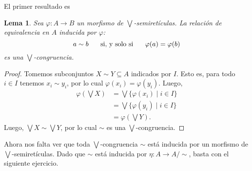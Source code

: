 \documentclass[12pt,letterpaper,titlepage]{article}
\newtheorem{lemma}{Lema}
\theoremstyle{definition}
\newcommand\Sup{\bigvee}
\renewcommand\phi{\varphi}
\newcommand\simr{{\sim}}
\newcommand\ssi{\hspace{5mm}\text{ si, y solo si }\hspace{5mm}}
\newcommand\<{\langle}
\renewcommand\>{\rangle}
\begin{document}
El primer resultado es
\begin{lemma}
    Sea $\phi:A\to B$ un morfismo de $\Sup$-semiretículas.
    La relación de equivalencia en $A$ inducida por $\phi$:
    \[
        a\sim b \ssi \phi(a) = \phi(b)
    \]
    es una $\Sup$-congruencia.
\end{lemma}
\begin{proof}
    Tomemos subconjuntos $X\sim Y\subseteq A$ indicados por $I$.
    Esto es, para todo $i\in I$ tenemos $x_i\sim y_i$,
    por lo cual $\phi(x_i)=\phi(y_i)$.
    Luego,
    \begin{align*}
        \phi(\Sup X)
        &= \Sup\{\phi(x_i)\mid i\in I\} \\
        &= \Sup\{\phi(y_i)\mid i\in I\} \\
        &= \phi(\Sup Y).
    \end{align*}
    Luego, $\Sup X \sim \Sup Y$, por lo cual $\sim$ es una
    $\Sup$-congruencia.
\end{proof}

Ahora nos falta ver que toda $\Sup$-congruencia $\simr$ está
inducida por un morfismo de $\Sup$-semiretículas.
Dado que $\simr$ está inducida por $\eta:A\to A/\simr$,
basta con el siguiente ejercicio.
\end{document}
